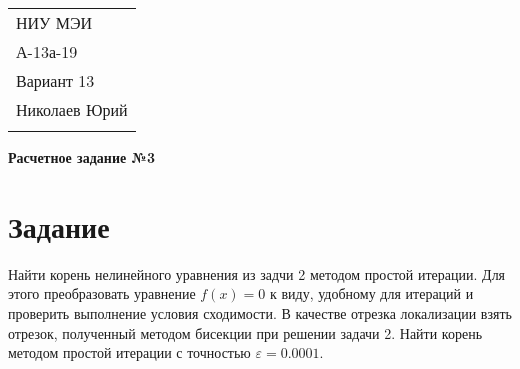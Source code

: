 \documentclass[a4paper,12pt]{article} %
\begin{document}



\thispagestyle{empty} %

\begin{tabular}{p{15.5cm}} %
НИУ МЭИ \\ А-13а-19  \\ Вариант 13 \\ Николаев Юрий\\
\hline %
\\
\end{tabular} %

\vspace*{0.3cm} %

\begin{center} %
	{\Large \bf Расчетное задание №3} %
	\vspace{2mm}
\end{center}  

\vspace{0.4cm}


\section{Задание}
Найти корень нелинейного уравнения из задчи 2 методом простой итерации. Для этого преобразовать уравнение $f(x) = 0$ к виду, удобному для итераций и проверить выполнение условия сходимости. В качестве отрезка локализации взять отрезок, полученный методом бисекции при решении задачи 2. Найти корень методом простой итерации с точностью $\varepsilon = 0.0001$.
\end{document}
